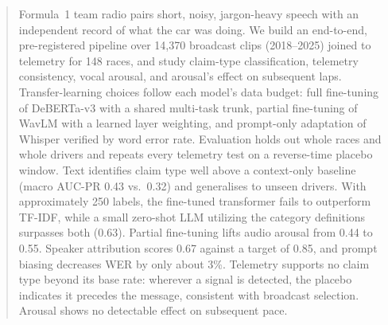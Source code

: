 \begin{abstract}
Formula~1 team radio pairs short, noisy, jargon-heavy speech with an independent record of what the car was doing. We build an end-to-end, pre-registered pipeline over 14{,}370 broadcast clips (2018--2025) joined to telemetry for 148 races, and study claim-type classification, telemetry consistency, vocal arousal, and arousal's effect on subsequent laps. Transfer-learning choices follow each model's data budget: full fine-tuning of DeBERTa-v3 with a shared multi-task trunk, partial fine-tuning of WavLM with a learned layer weighting, and prompt-only adaptation of Whisper verified by word error rate. Evaluation holds out whole races and whole drivers and repeats every telemetry test on a reverse-time placebo window. Text identifies claim type well above a context-only baseline (macro AUC-PR 0.43 vs.\ 0.32) and generalises to unseen drivers. With approximately 250 labels, the fine-tuned transformer fails to outperform TF-IDF, while a small zero-shot LLM utilizing the category definitions surpasses both (0.63). Partial fine-tuning lifts audio arousal from 0.44 to 0.55. Speaker attribution scores 0.67 against a target of 0.85, and prompt biasing decreases WER by only about 3\%. Telemetry supports no claim type beyond its base rate: wherever a signal is detected, the placebo indicates it precedes the message, consistent with broadcast selection. Arousal shows no detectable effect on subsequent pace.
\end{abstract}
